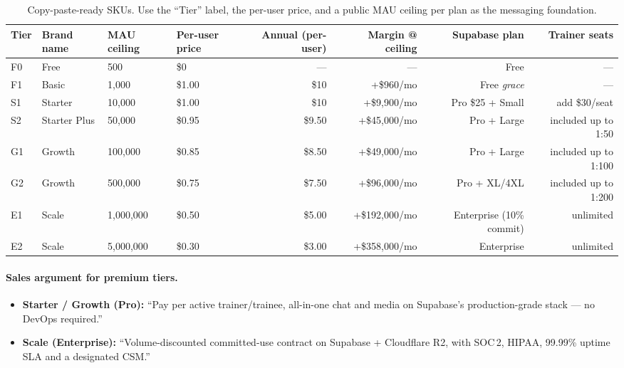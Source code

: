 \documentclass[11pt]{article}
\begin{document}
\begin{table}[H]\centering\scriptsize
\caption{Copy-paste-ready SKUs. Use the ``Tier'' label, the per-user price, and a public MAU ceiling per plan as the messaging foundation.}
\begin{tabular}{l l l l r r r r}
\toprule
\textbf{Tier} & \textbf{Brand name} & \textbf{MAU ceiling} & \textbf{Per-user price} & \textbf{Annual (per-user)} & \textbf{Margin @ ceiling} & \textbf{Supabase plan} & \textbf{Trainer seats} \\
\midrule
F0  & Free          & 500         & \$0      & ---     & ---     & Free               & --- \\
F1  & Basic         & 1{,}000     & \$1.00   & \$10    & +\$960/mo     & Free \emph{grace}   & --- \\
S1  & Starter       & 10{,}000    & \$1.00   & \$10    & +\$9{,}900/mo  & Pro \$25 + Small    & add \$30/seat \\
S2  & Starter Plus  & 50{,}000    & \$0.95   & \$9.50  & +\$45{,}000/mo & Pro + Large         & included up to 1:50 \\
G1  & Growth        & 100{,}000   & \$0.85   & \$8.50  & +\$49{,}000/mo & Pro + Large         & included up to 1:100 \\
G2  & Growth        & 500{,}000   & \$0.75   & \$7.50  & +\$96{,}000/mo & Pro + XL/4XL        & included up to 1:200 \\
E1  & Scale         & 1{,}000{,}000 & \$0.50 & \$5.00  & +\$192{,}000/mo & Enterprise (10\% commit) & unlimited \\
E2  & Scale         & 5{,}000{,}000 & \$0.30 & \$3.00  & +\$358{,}000/mo & Enterprise          & unlimited \\
\bottomrule
\end{tabular}
\end{table}

\paragraph{Sales argument for premium tiers.}
\begin{itemize}[leftmargin=*,itemsep=2pt]
\item \textbf{Starter / Growth (Pro):} ``Pay per active trainer/trainee, all-in-one chat and media on Supabase's production-grade stack --- no DevOps required.''
\item \textbf{Scale (Enterprise):} ``Volume-discounted committed-use contract on Supabase + Cloudflare R2, with SOC\,2, HIPAA, 99.99\% uptime SLA and a designated CSM.''
\end{itemize}
\end{document}
